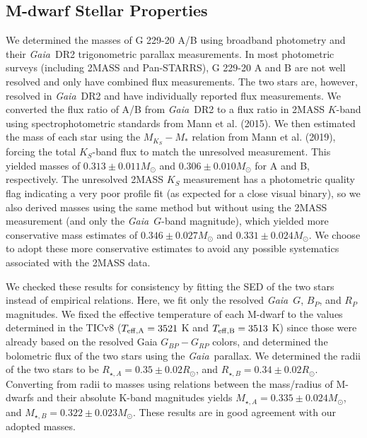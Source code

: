 \documentclass{nature3}
\newcommand{\rsun}{\ensuremath{R_\odot}}
\newcommand{\msun}{\ensuremath{M_\odot}}
\newcommand{\project}[1]{\textsl{#1}}
\newcommand{\Gaia}{\project{Gaia}}
\begin{document}
\begin{methods}
\subsection{M-dwarf Stellar Properties}
We determined the masses of G 229-20 A/B using broadband photometry and their \Gaia\ DR2 trigonometric parallax measurements. In most photometric surveys (including 2MASS and Pan-STARRS), G 229-20 A and B are not well resolved and only have combined flux measurements. The two stars are, however, resolved in \Gaia\ DR2 and have individually reported flux measurements. We converted the flux ratio of A/B from \Gaia\ DR2 to a flux ratio in 2MASS $K$-band using spectrophotometric standards from Mann et al. (2015\cite{mann2015}). We then estimated the mass of each star using the $M_{K_S}-M_*$ relation from Mann et al. (2019\cite{mann2019}), forcing the total $K_S$-band flux to match the unresolved measurement. This yielded masses of 0$.313\pm0.011M_\odot$ and $0.306\pm0.010M_\odot$ for A and B, respectively. The unresolved 2MASS $K_S$ measurement has a photometric quality flag indicating a very poor profile fit (as expected for a close visual binary), so we also derived masses using the same method but without using the 2MASS measurement (and only the \Gaia\ $G$-band magnitude), which yielded more conservative mass estimates of $0.346\pm0.027M_\odot$ and $0.331\pm0.024M_\odot$. We choose to adopt these more conservative estimates to avoid any possible systematics associated with the 2MASS data. 

We checked these results for consistency by fitting\cite{stassun2018} the SED of the two stars instead of empirical relations. Here, we fit only the resolved \Gaia\  $G$, $B_P$, and $R_P$ magnitudes.  We fixed the effective temperature of each M-dwarf to the values determined in the TICv8\cite{tic} ($T_{\rm{eff, A}} = 3521$ K  and $T_{\rm{eff, B}} = 3513$ K) since those were already based on the resolved Gaia $G_{BP} - G_{RP}$ colors, and determined the bolometric flux of the two stars using the \Gaia\ parallax. We determined the radii of the two stars to be $R_{\star,A} = 0.35 \pm 0.02 \rsun$, and $R_{\star,B} = 0.34 \pm 0.02 \rsun$. Converting from radii to masses using relations between the mass/radius of M-dwarfs and their absolute K-band magnitudes\cite{mann:2015, mann2019} yields $M_{\star,A} = 0.335 \pm 0.024 \msun$, and $M_{\star,B} = 0.322 \pm 0.023 \msun$. These results are in good agreement with our adopted masses. 



\end{methods}
\end{document}

